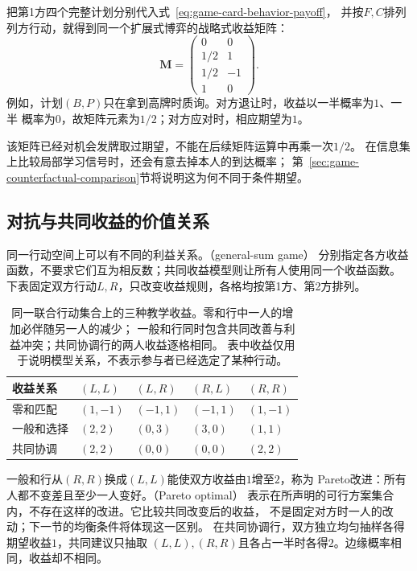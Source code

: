 把第1方四个完整计划分别代入式~\eqref{eq:game-card-behavior-payoff}，
并按\(F,C\)排列列方行动，就得到同一个扩展式博弈的战略式收益矩阵：
\begin{equation}
  \bm{M}
  =
  \begin{pmatrix}
    0 & 0\\
    1/2 & 1\\
    1/2 & -1\\
    1 & 0
  \end{pmatrix}.
  \label{eq:game-card-normal-form}
\end{equation}
例如，计划\((B,P)\)只在拿到高牌时质询。对方退让时，收益以一半概率为\(1\)、一半
概率为\(0\)，故矩阵元素为\(1/2\)；对方应对时，相应期望为\(1\)。

该矩阵已经对机会发牌取过期望，不能在后续矩阵运算中再乘一次\(1/2\)。
在信息集上比较局部学习信号时，还会有意去掉本人的到达概率；
第~\ref{sec:game-counterfactual-comparison}节将说明这为何不同于条件期望。

\subsection{对抗与共同收益的价值关系}
\label{sec:game-payoff-relations}

同一行动空间上可以有不同的利益关系。（general-sum game）
分别指定各方收益函数，不要求它们互为相反数；共同收益模型则让所有人使用同一个收益函数。
下表固定双方行动\(L,R\)，只改变收益规则，各格均按第1方、第2方排列。
\begin{table}[htbp]
  \centering
  \begin{tabularx}{\linewidth}{lXXXX}
    \toprule
    收益关系 & $(L,L)$ & $(L,R)$ & $(R,L)$ & $(R,R)$\\
    \midrule
    零和匹配 & $(1,-1)$ & $(-1,1)$ & $(-1,1)$ & $(1,-1)$\\
    一般和选择 & $(2,2)$ & $(0,3)$ & $(3,0)$ & $(1,1)$\\
    共同协调 & $(2,2)$ & $(0,0)$ & $(0,0)$ & $(2,2)$\\
    \bottomrule
  \end{tabularx}
  \caption{同一联合行动集合上的三种教学收益。零和行中一人的增加必伴随另一人的减少；
  一般和行同时包含共同改善与利益冲突；共同协调行的两人收益逐格相同。
  表中收益仅用于说明模型关系，不表示参与者已经选定了某种行动。}
  \label{tab:game-payoff-structures}
\end{table}

一般和行从\((R,R)\)换成\((L,L)\)能使双方收益由\(1\)增至\(2\)，称为
Pareto改进：所有人都不变差且至少一人变好。（Pareto optimal）
表示在所声明的可行方案集合内，不存在这样的改进。它比较共同改变后的收益，
不是固定对方时一人的改动；下一节的均衡条件将体现这一区别。
在共同协调行，双方独立均匀抽样各得期望收益\(1\)，共同建议只抽取
\((L,L),(R,R)\)且各占一半时各得\(2\)。边缘概率相同，收益却不相同。


